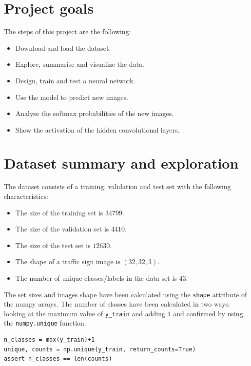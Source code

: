 \documentclass{article}
\let\cd\lstinline
\begin{document}
\section{Project goals}
The steps of this project are the following:
\begin{itemize}
\item Download and load the dataset.
\item Explore, summarise and visualize the data.
\item Design, train and test a neural network.
\item Use the model to predict new images.
\item Analyse the softmax probabilities of the new images.
\item Show the activation of the hidden convolutional layers.
\end{itemize}

\section{Dataset summary and exploration}
The dataset consists of a training, validation and test set with the following characteristics:
\begin{itemize}
\item The size of the training set is $34799$.
\item The size of the validation set is $4410$.
\item The size of the test set is $12630$.
\item The shape of a traffic sign image is $(32,32,3)$.
\item The number of unique classes/labels in the data set is $43$.
\end{itemize}

The set sizes and images shape have been calculated using the \cd+shape+ attribute of the numpy arrays. The number of classes have been calculated in two ways: looking at the maximum value of \cd+y_train+ and adding $1$ and confirmed by using the \cd+numpy.unique+ function.
\begin{lstlisting}
n_classes = max(y_train)+1
unique, counts = np.unique(y_train, return_counts=True)
assert n_classes == len(counts)
\end{lstlisting}
\end{document}
